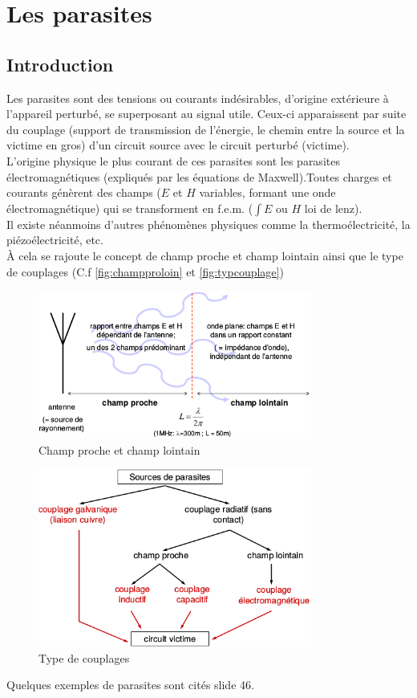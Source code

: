 \section{Les parasites}
\subsection{Introduction}
Les parasites sont des tensions ou courants indésirables, d'origine extérieure à l'appareil perturbé, se superposant au signal utile. Ceux-ci apparaissent par suite du couplage (support de transmission de l'énergie, le chemin entre la source et la victime en gros) d'un circuit source avec le circuit perturbé (victime).\\

L'origine physique le plus courant de ces parasites sont les parasites électromagnétiques (expliqués par les équations de Maxwell).Toutes charges et courants génèrent des champs (\(E\) et \(H\) variables, formant une onde électromagnétique) qui se transforment en f.e.m. (\(\int E\) ou \(H\) loi de lenz).\\
Il existe néanmoins d'autres phénomènes physiques comme la thermoélectricité, la piézoélectricité, etc.\\

À cela se rajoute le concept de champ proche et champ lointain ainsi que le type de couplages (C.f \autoref{fig:champproloin} et \autoref{fig:typcouplage})
\begin{figure}[H] 
	\centering 
	\includegraphics[width=0.8\textwidth,height=10\baselineskip,keepaspectratio]{ch3/image4} 
	\caption{Champ proche et champ lointain} 
	\label{fig:champproloin}
\end{figure}
\begin{figure}[H] 
	\centering 
	\includegraphics[width=0.8\textwidth,height=10\baselineskip,keepaspectratio]{ch3/image5} 
	\caption{Type de couplages}
	\label{fig:typcouplage} 
\end{figure}
Quelques exemples de parasites sont cités slide 46.
